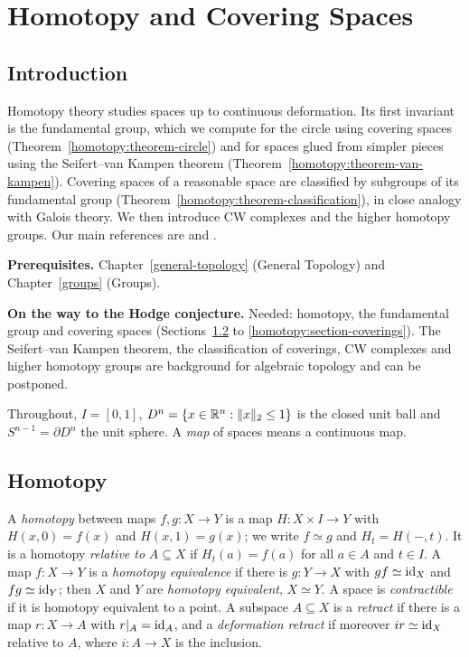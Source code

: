 \chapter{Homotopy and Covering Spaces}\label{homotopy}

\section{Introduction}\label{homotopy:section-introduction}

Homotopy theory studies spaces up to continuous deformation. Its first invariant is the fundamental group, which we
compute for the circle using covering spaces (Theorem~\ref{homotopy:theorem-circle}) and for spaces glued from simpler
pieces using the Seifert--van Kampen theorem (Theorem~\ref{homotopy:theorem-van-kampen}). Covering spaces of a
reasonable space are classified by subgroups of its fundamental group (Theorem~\ref{homotopy:theorem-classification}),
in close analogy with Galois theory. We then introduce CW complexes and the higher homotopy groups. Our main references
are \cite{hatcher-at} and \cite{spanier-at}.

\noindent\textbf{Prerequisites.} Chapter~\ref{general-topology} (General Topology) and Chapter~\ref{groups} (Groups).

\noindent\textbf{On the way to the Hodge conjecture.} Needed: homotopy, the fundamental group and covering spaces (Sections~\ref{homotopy:section-homotopy} to \ref{homotopy:section-coverings}). The Seifert--van Kampen theorem, the classification of
coverings, CW complexes and higher homotopy groups are background for algebraic topology and can be postponed.

Throughout, $I = [0, 1]$, $D^n = \{x \in \mathbb{R}^n : \|x\|_2 \leq 1\}$ is the closed unit ball and $S^{n-1} = \partial D^n$ the unit sphere.
A \emph{map} of spaces means a continuous map.

\section{Homotopy}\label{homotopy:section-homotopy}

\begin{definition}\label{homotopy:definition-homotopy}
A \emph{homotopy} between maps $f, g \colon X \to Y$ is a map $H \colon X \times I \to Y$ with $H(x, 0) = f(x)$ and $H(x, 1) = g(x)$; we write
$f \simeq g$ and $H_t = H(-, t)$. It is a homotopy \emph{relative to} $A \subseteq X$ if $H_t(a) = f(a)$ for all $a \in A$ and $t \in I$. A map
$f \colon X \to Y$ is a \emph{homotopy equivalence} if there is $g \colon Y \to X$ with $gf \simeq \mathrm{id}_X$ and $fg \simeq \mathrm{id}_Y$; then $X$ and $Y$ are
\emph{homotopy equivalent}, $X \simeq Y$. A space is \emph{contractible} if it is homotopy equivalent to a point. A subspace $A \subseteq X$ is a
\emph{retract} if there is a map $r \colon X \to A$ with $r|_A = \mathrm{id}_A$, and a \emph{deformation retract} if moreover $ir \simeq \mathrm{id}_X$ relative to $A$,
where $i \colon A \to X$ is the inclusion.
\end{definition}

